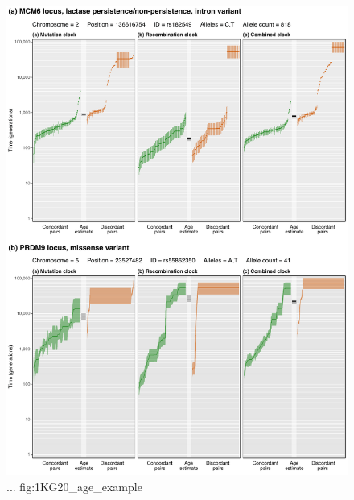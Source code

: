 

\begin{figure}[p]
\centering
\includegraphics[width=\textwidth]{./img/ch5/1KG20_age_example}
%
{...}%
{fig:1KG20_age_example}
\end{figure}
